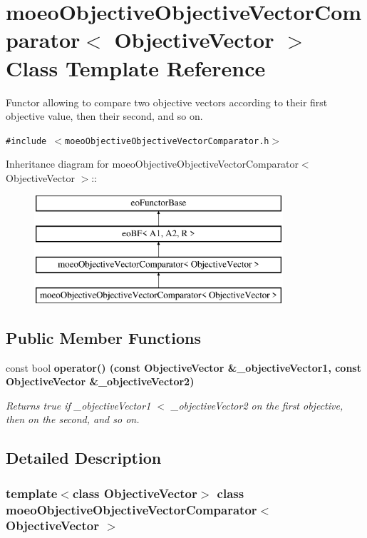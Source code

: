 \section{moeo\-Objective\-Objective\-Vector\-Comparator$<$ Objective\-Vector $>$ Class Template Reference}
\label{classmoeoObjectiveObjectiveVectorComparator}
Functor allowing to compare two objective vectors according to their first objective value, then their second, and so on.  


{\tt \#include $<$moeo\-Objective\-Objective\-Vector\-Comparator.h$>$}

Inheritance diagram for moeo\-Objective\-Objective\-Vector\-Comparator$<$ Objective\-Vector $>$::\begin{figure}[H]
\begin{center}
\leavevmode
\includegraphics[height=4cm]{classmoeoObjectiveObjectiveVectorComparator}
\end{center}
\end{figure}
\subsection*{Public Member Functions}
\begin{CompactItemize}
\item 
const bool \bf{operator()} (const \bf{Objective\-Vector} \&\_\-objective\-Vector1, const \bf{Objective\-Vector} \&\_\-objective\-Vector2)
\begin{CompactList}\small\item\em Returns true if \_\-objective\-Vector1 $<$ \_\-objective\-Vector2 on the first objective, then on the second, and so on. \item\end{CompactList}\end{CompactItemize}


\subsection{Detailed Description}
\subsubsection*{template$<$class Objective\-Vector$>$ class moeo\-Objective\-Objective\-Vector\-Comparator$<$ Objective\-Vector $>$}

